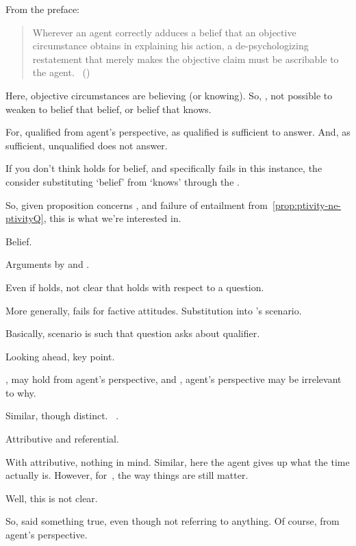 \begin{note}
{    From the preface:
    \begin{quote}
      Wherever an agent correctly adduces a belief that an objective circumstance obtains in explaining his action, a de-psychologizing restatement that merely makes the objective claim must be ascribable to the agent.%
      \mbox{ }\hfill\mbox{(\citeyear[120]{Collins:1997wn})}
    \end{quote}

    Here, objective circumstances are believing (or knowing).
    So, \citeauthor{Collins:1997wn}, not possible to weaken to belief that belief, or belief that knows.
  }

  For, qualified from agent's perspective, as qualified is sufficient to answer.
  And, as sufficient, unqualified does not answer.

  If you don't think \ptivity{} holds for belief, and specifically fails in this instance, the consider substituting `belief' from `knows' through the .
\end{note}


\begin{note}
  So, given proposition concerns \qzS{}, and failure of entailment from~\autoref{prop:ptivity-ne-ptivityQ}, this is what we're interested in.
\end{note}


\begin{note}
  Belief.

  Arguments by \citeauthor{Collins:1997wn} and \citeauthor{Dancy:2000aa}.
\end{note}

\begin{note}
  Even if \ptivity{} holds, not clear that holds with respect to a question.
\end{note}


\begin{note}
  More generally, fails for factive attitudes.
  Substitution into \citeauthor{Hyman:1999tm}'s scenario.

  Basically, scenario is such that question asks about qualifier.

  Looking ahead, key point.
\end{note}


\begin{note}
  \citeauthor{Collins:1997wn}, may hold from agent's perspective, and \citeauthor{Hyman:1999tm}, agent's perspective may be irrelevant to why.
\end{note}


\begin{note}
  Similar, though distinct.
  ~\cite{Donnellan:1966wt}.

  Attributive and referential.

  With attributive, nothing in mind.
  Similar, here the agent gives up what the time actually is.
  However, for~\citeauthor{Donnellan:1966wt}, the way things are still matter.

  Well, this is not clear.

  So, said something true, even though not referring to anything.
  Of course, from agent's perspective.
\end{note}


